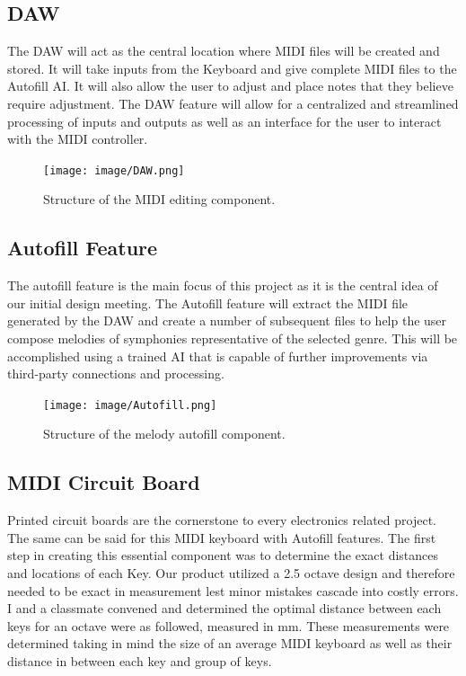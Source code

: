 \newpage
\subsection{DAW}

The DAW will act as the central location where MIDI files will be created and stored. It
will take inputs from the Keyboard and give complete MIDI files to the Autofill AI. It
will also allow the user to adjust and place notes that they believe require adjustment.
The DAW feature will allow for a centralized and streamlined processing of inputs and
outputs as well as an interface for the user to interact with the MIDI controller.

\begin{figure}[h!]
  \centering
  \texttt{[image: image/DAW.png]}
  \caption{Structure of the MIDI editing component.}
  \label{fig:daw_diagram}
\end{figure}

\newpage
\subsection{Autofill Feature}

The autofill feature is the main focus of this project as it is the central idea of our
initial design meeting. The Autofill feature will extract the MIDI file generated by the
DAW and create a number of subsequent files to help the user compose melodies of
symphonies representative of the selected genre. This will be accomplished using a trained
AI that is capable of further improvements via third-party connections and processing.

\begin{figure}[h!]
  \centering
  \texttt{[image: image/Autofill.png]}
  \caption{Structure of the melody autofill component.}
  \label{fig:autofill_diagram}
\end{figure}
\clearpage

\subsection{MIDI Circuit Board}

Printed circuit boards are the cornerstone to every electronics related project.
The same can be said for this MIDI keyboard with Autofill features. The first
step in creating this essential component was to determine the exact distances
and locations of each Key. Our product utilized a 2.5 octave design and
therefore needed to be exact in measurement lest minor mistakes cascade into
costly errors. I and a classmate convened and determined the optimal distance
between each keys for an octave were as followed, measured in mm. These
measurements were determined taking in mind the size of an average MIDI keyboard
as well as their distance in between each key and group of keys.


